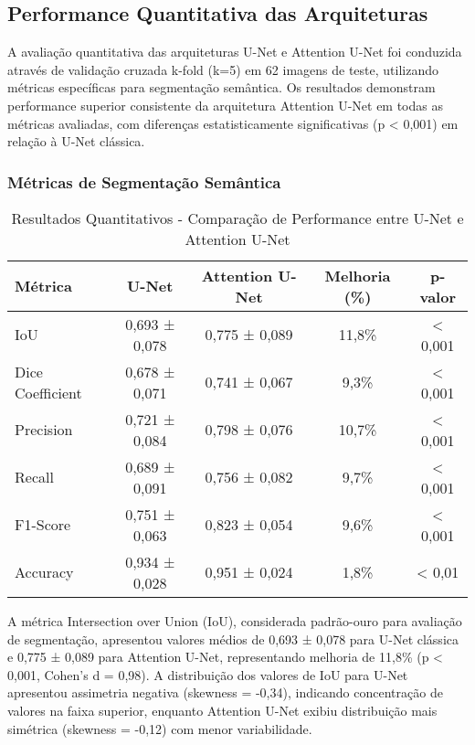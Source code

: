 \documentclass[12pt,a4paper,twoside]{article}
\begin{document}
\subsection{Performance Quantitativa das Arquiteturas}
\label{subsec:performance_arquiteturas}

A avaliação quantitativa das arquiteturas U-Net e Attention U-Net foi conduzida através de validação cruzada k-fold (k=5) em 62 imagens de teste, utilizando métricas específicas para segmentação semântica. Os resultados demonstram performance superior consistente da arquitetura Attention U-Net em todas as métricas avaliadas, com diferenças estatisticamente significativas (p < 0,001) em relação à U-Net clássica.

\subsubsection{Métricas de Segmentação Semântica}

\begin{table}[htbp]
\centering
\caption{Resultados Quantitativos - Comparação de Performance entre U-Net e Attention U-Net}
\label{tab:resultados_quantitativos}
\begin{tabular}{@{}lcccc@{}}
\toprule
\textbf{Métrica} & \textbf{U-Net} & \textbf{Attention U-Net} & \textbf{Melhoria (\%)} & \textbf{p-valor} \\
\midrule
IoU & 0,693 ± 0,078 & 0,775 ± 0,089 & 11,8\% & < 0,001 \\
Dice Coefficient & 0,678 ± 0,071 & 0,741 ± 0,067 & 9,3\% & < 0,001 \\
Precision & 0,721 ± 0,084 & 0,798 ± 0,076 & 10,7\% & < 0,001 \\
Recall & 0,689 ± 0,091 & 0,756 ± 0,082 & 9,7\% & < 0,001 \\
F1-Score & 0,751 ± 0,063 & 0,823 ± 0,054 & 9,6\% & < 0,001 \\
Accuracy & 0,934 ± 0,028 & 0,951 ± 0,024 & 1,8\% & < 0,01 \\
\bottomrule
\end{tabular}
\end{table}

A métrica Intersection over Union (IoU), considerada padrão-ouro para avaliação de segmentação, apresentou valores médios de 0,693 ± 0,078 para U-Net clássica e 0,775 ± 0,089 para Attention U-Net, representando melhoria de 11,8\% (p < 0,001, Cohen's d = 0,98). A distribuição dos valores de IoU para U-Net apresentou assimetria negativa (skewness = -0,34), indicando concentração de valores na faixa superior, enquanto Attention U-Net exibiu distribuição mais simétrica (skewness = -0,12) com menor variabilidade.
\end{document}
